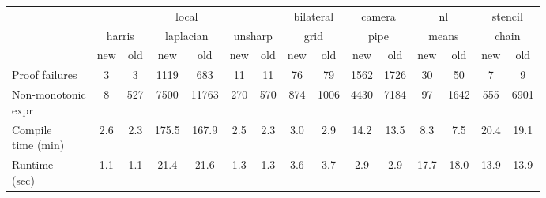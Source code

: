 {
\setlength\tabcolsep{2.5pt}
  \begin{tabular}{l|cc|cc|cc|cc|cc|cc|cc}
& \multicolumn{2}{c|}{}  & \multicolumn{2}{c|}{local}  & \multicolumn{2}{c|}{}  & \multicolumn{2}{c|}{bilateral}  & \multicolumn{2}{c|}{camera}  & \multicolumn{2}{c|}{nl}  & \multicolumn{2}{c}{stencil} \\
& \multicolumn{2}{c|}{harris}  & \multicolumn{2}{c|}{laplacian}  & \multicolumn{2}{c|}{unsharp}  & \multicolumn{2}{c|}{grid}  & \multicolumn{2}{c|}{pipe}  & \multicolumn{2}{c|}{means}  & \multicolumn{2}{c}{chain}  \\
& new & old & new & old & new & old & new & old & new & old & new & old & new & old \\\hline
Proof failures & 3 & 3 & 1119 & 683 & 11 & 11 & 76 & 79 & 1562 & 1726 & 30 & 50 & 7 & 9\\
\makecell[l]{Non-monotonic\\ expr} & 8 & 527 & 7500 & 11763 & 270 & 570 & 874 & 1006 & 4430 & 7184 & 97 & 1642 & 555 & 6901\\\hline
\makecell[l]{Compile\\ time (min)} & 2.6 & 2.3 & 175.5 & 167.9 & 2.5 & 2.3 & 3.0 & 2.9 & 14.2 & 13.5 & 8.3 & 7.5 & 20.4 & 19.1\\
\makecell[l]{Runtime \\ (sec)} & 1.1 & 1.1 & 21.4 & 21.6 & 1.3 & 1.3 & 3.6 & 3.7 & 2.9 & 2.9 & 17.7 & 18.0 & 13.9 & 13.9
\end{tabular}
}